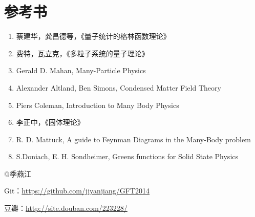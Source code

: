 \section*{参考书}

\begin{enumerate}

\item

蔡建华，龚昌德等，《量子统计的格林函数理论》


\item 

费特，瓦立克，《多粒子系统的量子理论》


\item

Gerald D. Mahan, Many-Particle Physics


\item

Alexander Altland, Ben Simons, Condensed Matter Field Theory


\item

Piers Coleman, Introduction to Many Body Physics



\item

李正中，《固体理论》



\item

R. D. Mattuck,  A guide to Feynman Diagrams in the Many-Body problem
 

\item

S.Doniach, E. H. Sondheimer, Greens functions for Solid State Physics


\end{enumerate}


@季燕江

Git：\url{https://github.com/jiyanjiang/GFT2014}

豆瓣：\url{http://site.douban.com/223228/}